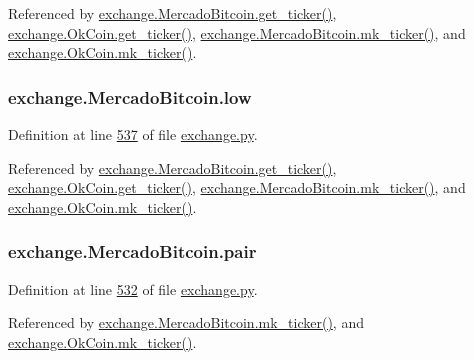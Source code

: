 Referenced by \hyperlink{exchange_8py_source_l00543}{exchange.\+Mercado\+Bitcoin.\+get\+\_\+ticker()}, \hyperlink{exchange_8py_source_l00608}{exchange.\+Ok\+Coin.\+get\+\_\+ticker()}, \hyperlink{exchange_8py_source_l00557}{exchange.\+Mercado\+Bitcoin.\+mk\+\_\+ticker()}, and \hyperlink{exchange_8py_source_l00622}{exchange.\+Ok\+Coin.\+mk\+\_\+ticker()}.

\subsubsection[{\texorpdfstring{low}{low}}]{\setlength{\rightskip}{0pt plus 5cm}exchange.\+Mercado\+Bitcoin.\+low}\hypertarget{classexchange_1_1_mercado_bitcoin_aaa3aae824bfc5ba3b7dc5252e9554713}{}\label{classexchange_1_1_mercado_bitcoin_aaa3aae824bfc5ba3b7dc5252e9554713}


Definition at line \hyperlink{exchange_8py_source_l00537}{537} of file \hyperlink{exchange_8py_source}{exchange.\+py}.



Referenced by \hyperlink{exchange_8py_source_l00543}{exchange.\+Mercado\+Bitcoin.\+get\+\_\+ticker()}, \hyperlink{exchange_8py_source_l00608}{exchange.\+Ok\+Coin.\+get\+\_\+ticker()}, \hyperlink{exchange_8py_source_l00557}{exchange.\+Mercado\+Bitcoin.\+mk\+\_\+ticker()}, and \hyperlink{exchange_8py_source_l00622}{exchange.\+Ok\+Coin.\+mk\+\_\+ticker()}.

\subsubsection[{\texorpdfstring{pair}{pair}}]{\setlength{\rightskip}{0pt plus 5cm}exchange.\+Mercado\+Bitcoin.\+pair}\hypertarget{classexchange_1_1_mercado_bitcoin_a879f8ca352d313230d72e6e8785985a1}{}\label{classexchange_1_1_mercado_bitcoin_a879f8ca352d313230d72e6e8785985a1}


Definition at line \hyperlink{exchange_8py_source_l00532}{532} of file \hyperlink{exchange_8py_source}{exchange.\+py}.



Referenced by \hyperlink{exchange_8py_source_l00557}{exchange.\+Mercado\+Bitcoin.\+mk\+\_\+ticker()}, and \hyperlink{exchange_8py_source_l00622}{exchange.\+Ok\+Coin.\+mk\+\_\+ticker()}.

